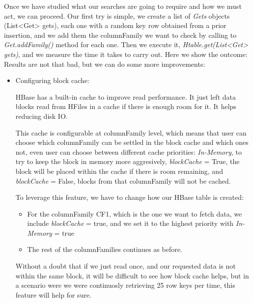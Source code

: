 Once we have studied what our searches are going to require and how we must act, we can proceed. Our first try is simple, we create a list of \textit{Gets} objects (List<Get> gets), each one with a random key row obtained from a prior insertion, and we add them the columnFamily we want to check by calling to \textit{Get.addFamily()} method for each one. Then we execute it, \textit{Htable.get(List<Get> gets)}, and we measure the time it takes to carry out.
\bigskip
Here we show the outcome:
\bigskip
Results are not that bad, but we can do some more improvements:
\begin{itemize}
\item Configuring block cache:
\par 
HBase has a built-in cache to improve read performance. It just left data blocks read from HFiles in a cache if there is enough room for it. It helps reducing disk IO.
\par
 This cache is configurable at columnFamily level, which means that user can choose which columnFamily can be settled in the block cache and which ones not, even user can choose between different cache priorities: \textit{In-Memory}, to try to keep the block in memory more aggresively, \textit{blockCache} = True, the block will be placed within the cache if there is room remaining, and \textit{blockCache} = False, blocks from that columnFamily will not be cached.
\par 
To leverage this feature, we have to change how our HBase table is created: 
\begin{itemize}
\item For the columnFamily CF1, which is the one we want to fetch data, we include \textit{blockCache} = true, and we set it to the highest priority with \textit{In-Memory} = true
\item The rest of the columnFamilies continues as before.
\end{itemize}

Without a doubt that if we just read once, and our requested data is not within the same block, it will be difficult to see how block cache helps, but in a scenario were we were continuosly retrieving 25 row keys per time, this feature will help for sure.



\end{itemize}
